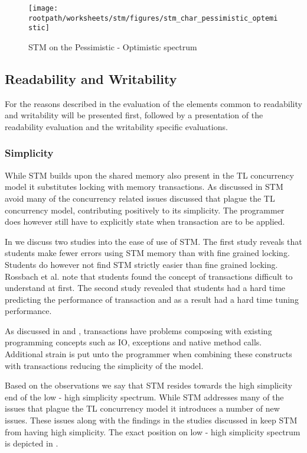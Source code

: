 \begin{figure}[htbp]
\centering
 \texttt{[image: \\rootpath/worksheets/stm/figures/stm\_char\_pessimistic\_optemistic]} 
 \caption{\ac{STM} on the Pessimistic - Optimistic spectrum}
\label{fig:stm_char_pes_opti}
\end{figure}

\subsection{Readability and Writability}
For the reasons described in  the evaluation of the elements common to readability and writability will be presented first, followed by a presentation of the readability evaluation and the writability specific evaluations.

\subsubsection{Simplicity}
\label{subsec:stm_char_simplicity}
While \ac{STM} builds upon the shared memory also present in the \ac{TL} concurrency model it substitutes locking with memory transactions. As discussed in  \ac{STM} avoid many of the concurrency related issues discussed that plague the  \ac{TL} concurrency model, contributing positively to its simplicity. The programmer does however still have to explicitly state when transaction are to be applied.

In  we discuss two studies into the ease of use of \ac{STM}. The first study reveals that students make fewer errors using \ac{STM} memory than with fine grained locking. Students do however not find \ac{STM} strictly easier than fine grained locking. Rossbach et al. note that students found the concept of transactions difficult to understand at first. The second study revealed that students had a hard time predicting the performance of transaction and as a result had a hard time tuning performance.

As discussed in  and , transactions have problems composing with existing programming concepts such as \ac{IO}, exceptions and native method calls. Additional strain is put unto the programmer when combining these constructs with transactions reducing the simplicity of the  model.

Based on the observations we say that \ac{STM} resides towards the high simplicity end of the low - high simplicity spectrum. While \ac{STM} addresses many of the issues that plague the \ac{TL} concurrency model it introduces a number of new issues. These issues along with the findings in the studies discussed in  keep \ac{STM} from having high simplicity. The exact position on low - high simplicity spectrum is depicted in .

